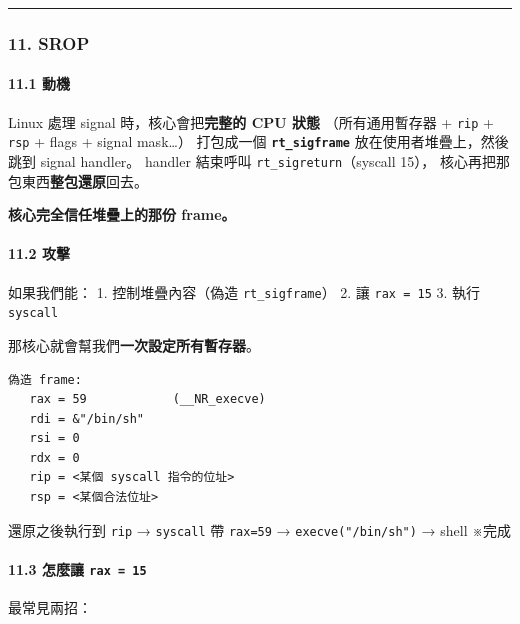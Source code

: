 \documentclass[10pt,a4paper]{article}
\begin{document}
\begin{center}\rule{0.5\linewidth}{0.5pt}\end{center}

\subsubsection{11. SROP}\label{srop}

\paragraph{11.1 動機}\label{ux52d5ux6a5f}

Linux 處理 signal 時，核心會把\textbf{完整的 CPU 狀態} （所有通用暫存器
+ \texttt{rip} + \texttt{rsp} + flags + signal mask\ldots） 打包成一個
\textbf{\texttt{rt\_\allowbreak{}sigframe}} 放在使用者堆疊上，然後跳到 signal
handler。 handler 結束呼叫 \texttt{rt\_\allowbreak{}sigreturn}（syscall 15），
核心再把那包東西\textbf{整包還原}回去。

\textbf{核心完全信任堆疊上的那份 frame。}

\paragraph{11.2 攻擊}\label{ux653bux64ca}

如果我們能： 1. 控制堆疊內容（偽造 \texttt{rt\_\allowbreak{}sigframe}） 2. 讓
\texttt{rax\ \allowbreak{}=\ \allowbreak{}15} 3. 執行 \texttt{syscall}

那核心就會幫我們\textbf{一次設定所有暫存器}。

\begin{Verbatim}[breaklines=true,breakanywhere=true,breakautoindent=false,fontsize=\fontsize{7.0}{9.5}\selectfont]
偽造 frame:
   rax = 59            (__NR_execve)
   rdi = &"/bin/sh"
   rsi = 0
   rdx = 0
   rip = <某個 syscall 指令的位址>
   rsp = <某個合法位址>
\end{Verbatim}

還原之後執行到 \texttt{rip} → \texttt{syscall} 帶 \texttt{rax=59} →
\texttt{execve("/\allowbreak{}bin/\allowbreak{}sh")} → shell ※完成

\paragraph{\texorpdfstring{11.3 怎麼讓
\texttt{rax\ \allowbreak{}=\ \allowbreak{}15}}{11.3 怎麼讓 rax = 15}}\label{ux600eux9ebcux8b93-rax-15}

最常見兩招：
\end{document}
